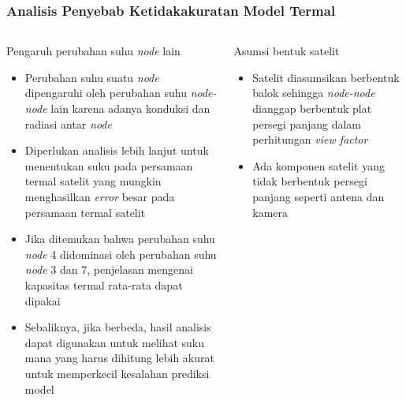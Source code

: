 \documentclass[8pt]{beamer}
\begin{document}
\begin{frame}
  \frametitle{Analisis Penyebab Ketidakakuratan Model Termal}
  \begin{columns}[T]
    \begin{block}{\center Pengaruh perubahan suhu \textit{node} lain}
      \begin{itemize}
        \item Perubahan suhu suatu \textit{node} dipengaruhi oleh perubahan suhu \textit{node-node} lain karena adanya konduksi dan radiasi antar \textit{node}
        \item Diperlukan analisis lebih lanjut untuk menentukan suku pada persamaan termal satelit yang mungkin menghasilkan \textit{error} besar pada persamaan termal satelit
        \item Jika ditemukan bahwa perubahan suhu \textit{node} 4 didominasi oleh perubahan suhu \textit{node} 3 dan 7, penjelasan mengenai kapasitas termal rata-rata dapat dipakai
        \item Sebaliknya, jika berbeda, hasil analisis dapat digunakan untuk melihat suku mana yang harus dihitung lebih akurat untuk memperkecil kesalahan prediksi model
      \end{itemize}
    \end{block}
    \begin{block}{\center Asumsi bentuk satelit}
      \begin{itemize}
        \item Satelit diasumsikan berbentuk balok sehingga \textit{node-node} dianggap berbentuk plat persegi panjang dalam perhitungan \textit{view factor}
        \item Ada komponen satelit yang tidak berbentuk persegi panjang seperti antena dan kamera
      \end{itemize}
    \end{block}
  \end{columns}
\end{frame}

\end{document}

